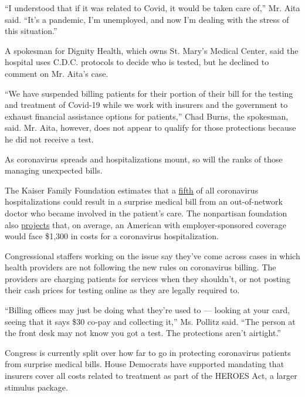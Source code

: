 ``I understood that if it was related to Covid, it would be taken care
of,'' Mr. Aita said. ``It's a pandemic, I'm unemployed, and now I'm
dealing with the stress of this situation.''

A spokesman for Dignity Health, which owns St. Mary's Medical Center,
said the hospital uses C.D.C. protocols to decide who is tested, but he
declined to comment on Mr. Aita's case.

``We have suspended billing patients for their portion of their bill for
the testing and treatment of Covid-19 while we work with insurers and
the government to exhaust financial assistance options for patients,''
Chad Burns, the spokesman, said. Mr. Aita, however, does not appear to
qualify for those protections because he did not receive a test.

As coronavirus spreads and hospitalizations mount, so will the ranks of
those managing unexpected bills.

The Kaiser Family Foundation estimates that a
\href{https://www.kff.org/coronavirus-covid-19/issue-brief/potential-costs-of-coronavirus-treatment-for-people-with-employer-coverage/}{fifth}
of all coronavirus hospitalizations could result in a surprise medical
bill from an out-of-network doctor who became involved in the patient's
care. The nonpartisan foundation also
\href{https://www.kff.org/coronavirus-covid-19/issue-brief/five-things-to-know-about-the-cost-of-covid-19-testing-and-treatment/}{projects}
that, on average, an American with employer-sponsored coverage would
face \$1,300 in costs for a coronavirus hospitalization.

Congressional staffers working on the issue say they've come across
cases in which health providers are not following the new rules on
coronavirus billing. The providers are charging patients for services
when they shouldn't, or not posting their cash prices for testing online
as they are legally required to.

``Billing offices may just be doing what they're used to --- looking at
your card, seeing that it says \$30 co-pay and collecting it,'' Ms.
Pollitz said. ``The person at the front desk may not know you got a
test. The protections aren't airtight.''

Congress is currently split over how far to go in protecting coronavirus
patients from surprise medical bills. House Democrats have supported
mandating that insurers cover all costs related to treatment as part of
the HEROES Act, a larger stimulus package.

